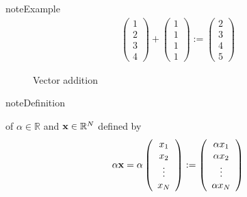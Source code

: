 \documentclass[letterpaper,10pt,english]{jupyterBook}
\begin{document}
\begin{sphinxadmonition}{note}{Example}
\begin{equation*}
\begin{split}
%
\left(
\begin{array}{c}
1 \\
2 \\
3 \\
4
\end{array}
\right)
+
\left(
\begin{array}{c}
1 \\
1 \\
1 \\
1
\end{array}
\right)
:=
\left(
\begin{array}{c}
2 \\
3 \\
4 \\
5
\end{array}
\right)
%
\end{split}
\end{equation*}\end{sphinxadmonition}

\begin{figure}[htbp]
\centering
\capstart

\noindent{}
\caption{Vector addition}\label{\detokenize{05.linear_algebra:f-vec-add}}\end{figure}

\begin{sphinxadmonition}{note}{Definition}

\sphinxAtStartPar
{} of \(\alpha \in \mathbb{R}\) and \({\bf x} \in \mathbb{R}^N\) defined by
\begin{equation*}
\begin{split}
%
\alpha {\bf x} 
=
\alpha \left(
\begin{array}{c}
x_1 \\
x_2 \\
\vdots \\
x_N
\end{array}
\right)
:=
\left(
\begin{array}{c}
\alpha x_1 \\
\alpha x_2 \\
\vdots \\
\alpha x_N
\end{array}
\right)
%
\end{split}
\end{equation*}\end{sphinxadmonition}
\end{document}
